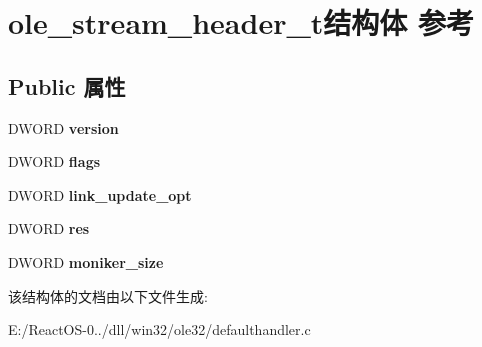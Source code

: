 \hypertarget{structole__stream__header__t}{}\section{ole\+\_\+stream\+\_\+header\+\_\+t结构体 参考}
\label{structole__stream__header__t}
\subsection*{Public 属性}
\begin{DoxyCompactItemize}
\item 
\mbox{\label{structole__stream__header__t_a3c1bcbd88c1e6bb3c841aa68e5ed9c0a}} 
D\+W\+O\+RD {\bfseries version}
\item 
\mbox{\label{structole__stream__header__t_abae4bd58bc120babad50cd6d24dc89f8}} 
D\+W\+O\+RD {\bfseries flags}
\item 
\mbox{\label{structole__stream__header__t_a12fde46b11e2216a93599a2c94075303}} 
D\+W\+O\+RD {\bfseries link\+\_\+update\+\_\+opt}
\item 
\mbox{\label{structole__stream__header__t_adf8053d7917912f8f30389bc1f9707c5}} 
D\+W\+O\+RD {\bfseries res}
\item 
\mbox{\label{structole__stream__header__t_ab131c38ec3e34745a3155226c1bdc612}} 
D\+W\+O\+RD {\bfseries moniker\+\_\+size}
\end{DoxyCompactItemize}


该结构体的文档由以下文件生成\+:\begin{DoxyCompactItemize}
\item 
E\+:/\+React\+O\+S-\/0../dll/win32/ole32/defaulthandler.\+c\end{DoxyCompactItemize}
